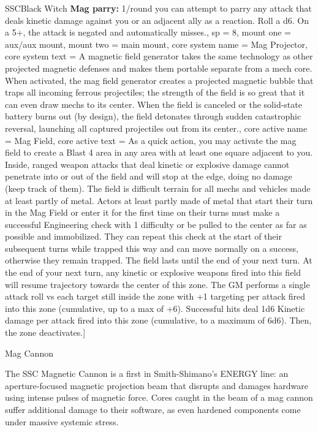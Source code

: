 \begin{mech}{SSC}{Black Witch}
{\textbf{Mag parry:} 1/round you can attempt to parry any attack that deals kinetic damage against you or an adjacent ally as a reaction. Roll a d6. On a 5+, the attack is negated and automatically misses.},
sp = 8,
mount one = aux/aux mount,
mount two = main mount,
core system name = Mag Projector,
core system text = {A magnetic field generator takes the same technology as other projected magnetic defenses and makes them portable separate from a mech core. When activated, the mag field generator creates a projected magnetic bubble that traps all incoming ferrous projectiles; the strength of the field is so great that it can even draw mechs to its center. When the field is canceled or the solid-state battery burns out (by design), the field detonates through sudden catastrophic reversal, launching all captured projectiles out from its center.},
core active name = Mag Field,
core active text = {As a quick action, you may activate the mag field to create a Blast 4 area in any area with at least one square adjacent to you. Inside, ranged weapon attacks that deal kinetic or explosive damage cannot penetrate into or out of the field and will stop at the edge, doing no damage (keep track of them). The field is difficult terrain for all mechs and vehicles made at least partly of metal. Actors at least partly made of metal that start their turn in the Mag Field or enter it for the first time on their turns must make a successful Engineering check with 1 difficulty or be pulled to the center as far as possible and immobilized. They can repeat this check at the start of their subsequent turns while trapped this way and can move normally on a success, otherwise they remain trapped. The field lasts until the end of your next turn. At the end of your next turn, any kinetic or explosive weapons fired into this field will resume trajectory towards the center of this zone. The GM performs a single attack roll vs each target still inside the zone with +1 targeting per attack fired into this zone (cumulative, up to a max of +6). Successful hits deal 1d6 Kinetic damage per attack fired into this zone (cumulative, to a maximum of 6d6). Then, the zone deactivates.}]


Mag Cannon

The SSC Magnetic Cannon is a first in Smith-Shimano’s ENERGY line: an aperture-focused magnetic projection beam that disrupts and damages hardware using intense pulses of magnetic force. Cores caught in the beam of a mag cannon suffer additional damage to their software, as even hardened components come under massive systemic stress.


\end{mech}
